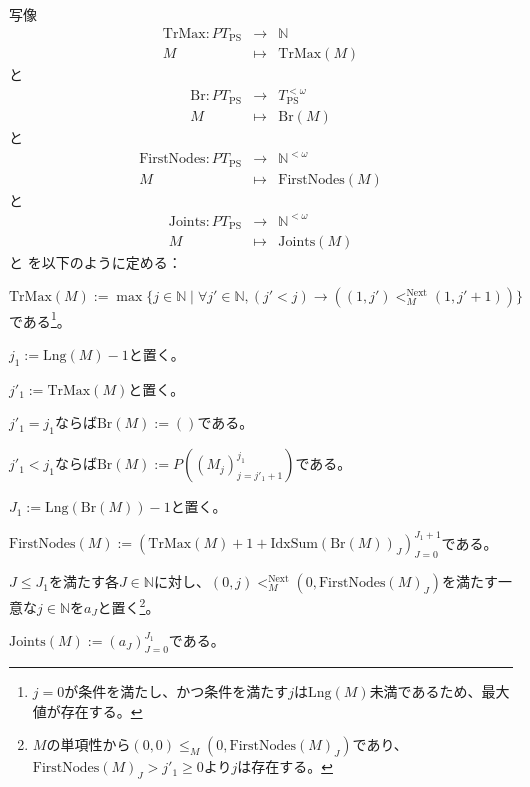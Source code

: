 \documentclass[dvipdfmx,uplatex]{jsarticle}
\theoremstyle{customnonumberbreakfortheorem}
\theoremstyle{customnonumberbreakforproof}
\begin{document}
写像
\begin{eqnarray*}
\textrm{TrMax} \colon PT_{\textrm{PS}} & \to & \mathbb{N} \\
M & \mapsto & \textrm{TrMax}(M)
\end{eqnarray*}
と
\begin{eqnarray*}
\textrm{Br} \colon PT_{\textrm{PS}} & \to & T_{\textrm{PS}}^{< \omega} \\
M & \mapsto & \textrm{Br}(M)
\end{eqnarray*}
と
\begin{eqnarray*}
\textrm{FirstNodes} \colon PT_{\textrm{PS}} & \to & \mathbb{N}^{< \omega} \\
M & \mapsto & \textrm{FirstNodes}(M)
\end{eqnarray*}
と
\begin{eqnarray*}
\textrm{Joints} \colon PT_{\textrm{PS}} & \to & \mathbb{N}^{< \omega} \\
M & \mapsto & \textrm{Joints}(M)
\end{eqnarray*}
と
を以下のように定める：
\begin{nenumerate}
	\item \(\textrm{TrMax}(M) := \max \{j \in \mathbb{N} \mid \forall j' \in \mathbb{N}, (j' < j) \to ((1,j') <_M^{\textrm{Next}} (1,j'+1))\}\)である\footnote{\(j = 0\)が条件を満たし、かつ条件を満たす\(j\)は\(\textrm{Lng}(M)\)未満であるため、最大値が存在する。}。
	\item \(j_1 := \textrm{Lng}(M) - 1\)と置く。
	\item \(j'_1 := \textrm{TrMax}(M)\)と置く。
	\item \(j'_1 = j_1\)ならば\(\textrm{Br}(M) := ()\)である。
	\item \(j'_1 < j_1\)ならば\(\textrm{Br}(M) := P((M_j)_{j=j'_1+1}^{j_1})\)である。
	\item \(J_1 := \textrm{Lng}(\textrm{Br}(M))-1\)と置く。
	\item \(\textrm{FirstNodes}(M) := (\textrm{TrMax}(M) + 1 + \textrm{IdxSum}(\textrm{Br}(M))_J)_{J=0}^{J_1+1}\)である。
	\item \(J \leq J_1\)を満たす各\(J \in \mathbb{N}\)に対し、\((0,j) <_M^{\textrm{Next}} (0,\textrm{FirstNodes}(M)_J)\)を満たす一意な\(j \in \mathbb{N}\)を\(a_J\)と置く\footnote{\(M\)の単項性から\((0,0) \leq_M (0,\textrm{FirstNodes}(M)_J)\)であり、\(\textrm{FirstNodes}(M)_J > j'_1 \geq 0\)より\(j\)は存在する。}。
	\item \(\textrm{Joints}(M) := (a_J)_{J=0}^{J_1}\)である。
\end{nenumerate}
\end{document}
